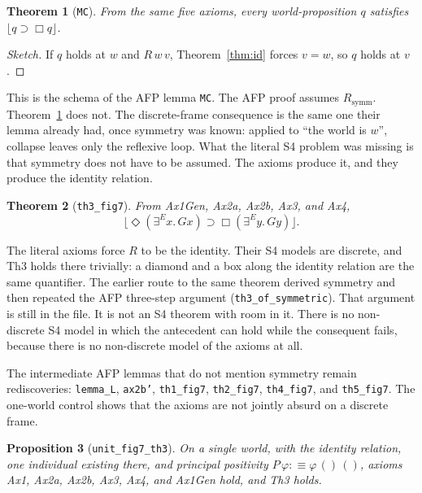 \documentclass[11pt,a4paper]{article}
\newcommand{\valid}[1]{\lfloor #1 \rfloor}
\newcommand{\Nec}{\Box}
\newcommand{\Pos}{\Diamond}
\newcommand{\exE}{\exists^{E}}
\newcommand{\lean}[1]{\texttt{#1}}
\newtheorem{theorem}{Theorem}
\newtheorem{proposition}[theorem]{Proposition}
\theoremstyle{definition}
\theoremstyle{remark}
\begin{document}
\begin{theorem}[\lean{MC}]
\label{thm:MC}
From the same five axioms, every world-proposition \(q\) satisfies
\(\valid{q \supset \Nec q}\).
\end{theorem}

\begin{proof}[Sketch]
If \(q\) holds at \(w\) and \(R\,w\,v\), Theorem~\ref{thm:id} forces \(v = w\),
so \(q\) holds at \(v\).
\end{proof}

This is the schema of the AFP lemma \lean{MC}.
The AFP proof assumes \(R_{\mathrm{symm}}\).
Theorem~\ref{thm:MC} does not.
The discrete-frame consequence is the same one their lemma already had, once
symmetry was known: applied to ``the world is \(w\)'', collapse leaves only
the reflexive loop.
What the literal S4 problem was missing is that symmetry does not have to be
assumed.
The axioms produce it, and they produce the identity relation.

\begin{theorem}[\lean{th3\_fig7}]
\label{thm:th3}
From Ax1Gen, Ax2a, Ax2b, Ax3, and Ax4,
\[
  \valid{\Pos(\exE x.\, G x) \supset \Nec(\exE y.\, G y)}.
\]
\end{theorem}

The literal axioms force \(R\) to be the identity.
Their S4 models are discrete, and Th3 holds there trivially: a diamond and a
box along the identity relation are the same quantifier.
The earlier route to the same theorem derived symmetry and then repeated the
AFP three-step argument (\lean{th3\_of\_symmetric}).
That argument is still in the file.
It is not an S4 theorem with room in it.
There is no non-discrete S4 model in which the antecedent can hold while the
consequent fails, because there is no non-discrete model of the axioms at all.

The intermediate AFP lemmas that do not mention symmetry remain
rediscoveries: \lean{lemma\_L}, \lean{ax2b'}, \lean{th1\_fig7},
\lean{th2\_fig7}, \lean{th4\_fig7}, and \lean{th5\_fig7}.
The one-world control shows that the axioms are not jointly absurd on a
discrete frame.

\begin{proposition}[\lean{unit\_fig7\_th3}]
\label{prop:unit}
On a single world, with the identity relation, one individual existing there,
and principal positivity \(P\,\varphi :\equiv \varphi\,()\,()\), axioms Ax1,
Ax2a, Ax2b, Ax3, Ax4, and Ax1Gen hold, and Th3 holds.
\end{proposition}
\end{document}

